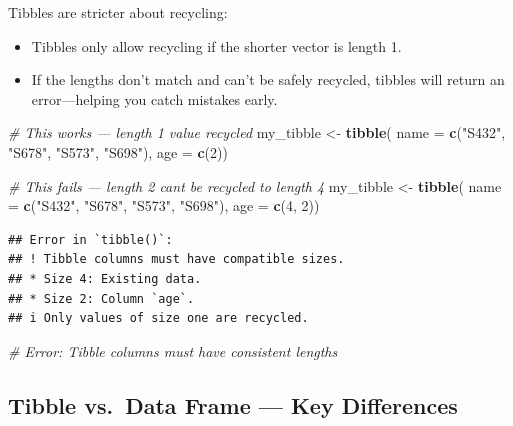 \documentclass[
]{book}
\newenvironment{Shaded}{\begin{snugshade}}{\end{snugshade}}
\newcommand{\AttributeTok}[1]{\textcolor[rgb]{0.13,0.29,0.53}{#1}}
\newcommand{\CommentTok}[1]{\textcolor[rgb]{0.56,0.35,0.01}{\textit{#1}}}
\newcommand{\DecValTok}[1]{\textcolor[rgb]{0.00,0.00,0.81}{#1}}
\newcommand{\FunctionTok}[1]{\textcolor[rgb]{0.13,0.29,0.53}{\textbf{#1}}}
\newcommand{\NormalTok}[1]{#1}
\newcommand{\OtherTok}[1]{\textcolor[rgb]{0.56,0.35,0.01}{#1}}
\newcommand{\StringTok}[1]{\textcolor[rgb]{0.31,0.60,0.02}{#1}}
\providecommand{\tightlist}{%
  \setlength{\itemsep}{0pt}\setlength{\parskip}{0pt}}
\begin{document}
Tibbles are stricter about recycling:

\begin{itemize}
\tightlist
\item
  Tibbles only allow recycling if the shorter vector is length 1.
\item
  If the lengths don't match and can't be safely recycled, tibbles will return an error---helping you catch mistakes early.
\end{itemize}

\begin{Shaded}
\begin{Highlighting}[]
\CommentTok{\# This works — length 1 value recycled}
\NormalTok{my\_tibble }\OtherTok{\textless{}{-}} \FunctionTok{tibble}\NormalTok{(}
  \AttributeTok{name =} \FunctionTok{c}\NormalTok{(}\StringTok{"S432"}\NormalTok{, }\StringTok{"S678"}\NormalTok{, }\StringTok{"S573"}\NormalTok{, }\StringTok{"S698"}\NormalTok{),}
  \AttributeTok{age =} \FunctionTok{c}\NormalTok{(}\DecValTok{2}\NormalTok{))}

\CommentTok{\# This fails — length 2 can\textquotesingle{}t be recycled to length 4}
\NormalTok{my\_tibble }\OtherTok{\textless{}{-}} \FunctionTok{tibble}\NormalTok{(}
  \AttributeTok{name =} \FunctionTok{c}\NormalTok{(}\StringTok{"S432"}\NormalTok{, }\StringTok{"S678"}\NormalTok{, }\StringTok{"S573"}\NormalTok{, }\StringTok{"S698"}\NormalTok{),}
  \AttributeTok{age =} \FunctionTok{c}\NormalTok{(}\DecValTok{4}\NormalTok{, }\DecValTok{2}\NormalTok{))}
\end{Highlighting}
\end{Shaded}

\begin{verbatim}
## Error in `tibble()`:
## ! Tibble columns must have compatible sizes.
## * Size 4: Existing data.
## * Size 2: Column `age`.
## i Only values of size one are recycled.
\end{verbatim}

\begin{Shaded}
\begin{Highlighting}[]
\CommentTok{\# Error: Tibble columns must have consistent lengths}
\end{Highlighting}
\end{Shaded}

\subsection{Tibble vs.~Data Frame --- Key Differences}\label{tibble-vs.-data-frame-key-differences}
\end{document}

